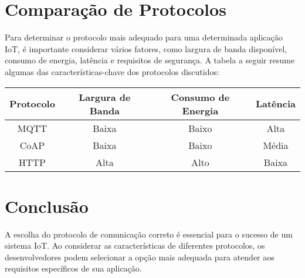 \documentclass{ufersa}
\begin{document}
\section{Comparação de Protocolos}
Para determinar o protocolo mais adequado para uma determinada aplicação IoT, é importante considerar vários fatores, como largura de banda disponível, consumo de energia, latência e requisitos de segurança. A tabela a seguir resume algumas das características-chave dos protocolos discutidos:

\begin{center}
\begin{tabular}{|c|c|c|c|}
\hline
Protocolo & Largura de Banda & Consumo de Energia & Latência \\
\hline
MQTT & Baixa & Baixo & Alta \\
CoAP & Baixa & Baixo & Média \\
HTTP & Alta & Alto & Baixa \\
\hline
\end{tabular}
\end{center}

\section{Conclusão}
A escolha do protocolo de comunicação correto é essencial para o sucesso de um sistema IoT. Ao considerar as características de diferentes protocolos, os desenvolvedores podem selecionar a opção mais adequada para atender aos requisitos específicos de sua aplicação.
\end{document}
